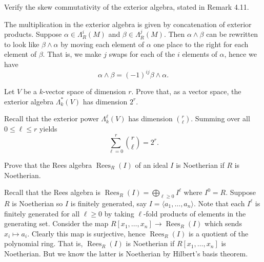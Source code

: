 \documentclass[../../master.tex]{subfiles}
\DeclareMathOperator{\Rees}{Rees}
\begin{document}
\begin{problem}
    Verify the skew commutativity of the exterior algebra, stated in Remark 4.11.
\end{problem}

\begin{solution}
    The multiplication in the exterior algebra is given by concatenation of exterior products.
    Suppose $\alpha \in \Lambda_R^{i}(M)$ and $\beta \in \Lambda_R^{j}(M)$.
    Then $\alpha \wedge \beta$ can be rewritten to look like $\beta \wedge \alpha$ by moving each element of $\alpha$ one place to the right for each element of $\beta$.
    That is, we make $j$ swaps for each of the $i$ elements of $\alpha$, hence we have
    \[
    \alpha \wedge \beta = (-1)^{ij} \beta \wedge \alpha.
    \]
\end{solution}

\begin{problem}
    Let $V$ be a $k$-vector space of dimension $r$.
    Prove that, as a vector space, the exterior algebra $\Lambda_k^{*}(V)$ has dimension $2^{r}$.
\end{problem}

\begin{solution}
    Recall that the exterior power $\Lambda_k^{\ell}(V)$ has dimension ${r \choose \ell}$.
    Summing over all $0 \leq \ell \leq r$ yields
    \[
    \sum_{\ell = 0}^{r} {r \choose \ell} = 2^{r}.
    \]
\end{solution}

\begin{problem}
    Prove that the Rees algebra $\Rees_R(I)$ of an ideal $I$ is Noetherian if $R$ is Noetherian.
\end{problem}

\begin{solution}
    Recall that the Rees algebra is $\Rees_R(I) = \bigoplus_{\ell \geq 0} I^{\ell}$ where $I^{0} = R$.
    Suppose $R$ is Noetherian so $I$ is finitely generated, say $I = \langle a_1, \ldots, a_n \rangle$.
    Note that each $I^{\ell}$ is finitely generated for all $\ell \geq 0$ by taking $\ell$-fold products of elements in the generating set.
    Consider the map $R[x_1, \ldots, x_n] \to \Rees_R(I)$ which sends $x_i \mapsto a_i$.
    Clearly this map is surjective, hence $\Rees_R(I)$ is a quotient of the polynomial ring.
    That is, $\Rees_R(I)$ is Noetherian if $R[x_1, \ldots, x_n]$ is Noetherian.
    But we know the latter is Noetherian by Hilbert's basis theorem.
\end{solution}
\end{document}
